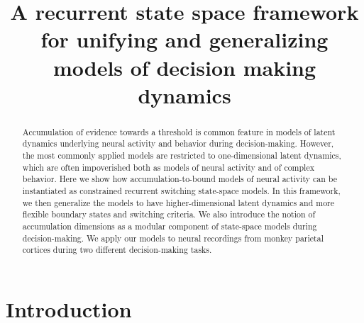 \documentclass{article}
\title{A recurrent state space framework for unifying and generalizing models of decision making dynamics}
\author{%
}
\begin{document}

\maketitle

\begin{abstract}
Accumulation of evidence towards a threshold is common feature in models of latent dynamics underlying neural activity and behavior during decision-making. However, the most commonly applied models are restricted to one-dimensional latent dynamics, which are often impoverished both as models of neural activity and of complex behavior. Here we show how accumulation-to-bound models of neural activity can be instantiated as constrained recurrent switching state-space models. In this framework, we then generalize the models to have higher-dimensional latent dynamics and more flexible boundary states and switching criteria. We also introduce the notion of accumulation dimensions as a modular component of state-space models during decision-making. We apply our models to neural recordings from monkey parietal cortices during two different decision-making tasks. 
\end{abstract}

\section{Introduction}
\end{document}
